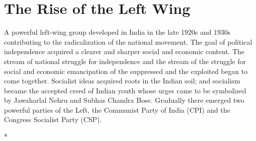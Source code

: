 \chapter{The Rise of the Left Wing}
\begin{multicols}{2}

A powerful left-wing group developed in India in the late 1920s and 1930s contributing to the radicalization of the national movement. The goal of political independence acquired a clearer and sharper social and economic content. The stream of national struggle for independence and the stream of the struggle for social and economic emancipation of the suppressed and the exploited began to come together. Socialist ideas acquired roots in the Indian soil; and socialism became the accepted creed of Indian youth whose urges came to be symbolized by Jawaharlal Nehru and Subhas Chandra Bose. Gradually there emerged two powerful parties of the Left, the Communist Party of India (CPI) and the Congress Socialist Party (CSP).

\begin{center}*\end{center}

\paragraph*{}


\end{multicols}
